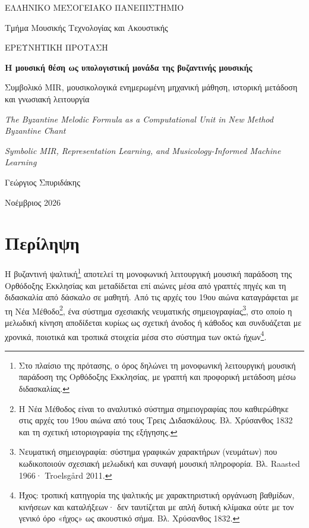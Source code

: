 \documentclass[11pt,a4paper]{article}
\begin{document}
\hypersetup{pageanchor=false}
\begin{titlepage}
\centering
\vspace*{1.0cm}
{\coverfont\large ΕΛΛΗΝΙΚΟ ΜΕΣΟΓΕΙΑΚΟ ΠΑΝΕΠΙΣΤΗΜΙΟ\par}
{\coverfont Τμήμα Μουσικής Τεχνολογίας και Ακουστικής\par}
\vspace{1.5cm}
{\coverfont\large ΕΡΕΥΝΗΤΙΚΗ ΠΡΟΤΑΣΗ\par}
\vspace{1.3cm}
{\coverfont\LARGE\bfseries Η μουσική θέση ως υπολογιστική μονάδα της βυζαντινής μουσικής\par}
\vspace{0.65cm}
{\coverfont\large Συμβολικό MIR, μουσικολογικά ενημερωμένη μηχανική μάθηση, ιστορική μετάδοση και γνωσιακή λειτουργία\par}
\vspace{1.1cm}
{\coverfont\large\itshape The Byzantine Melodic Formula as a Computational Unit in New Method Byzantine Chant\par}
\vspace{0.3cm}
{\coverfont\normalsize\itshape Symbolic MIR, Representation Learning, and Musicology-Informed Machine Learning\par}
\vspace{9.8cm}
{\coverfont Γεώργιος Σπυριδάκης\par}
\vspace{0.8cm}
{\coverfont\small Νοέμβριος 2026\par}
\vfill
\end{titlepage}
\hypersetup{pageanchor=true}

\section*{Περίληψη}

Η βυζαντινή ψαλτική\footnote{Στο πλαίσιο της πρότασης, ο όρος δηλώνει τη μονοφωνική λειτουργική μουσική παράδοση της Ορθόδοξης Εκκλησίας, με γραπτή και προφορική μετάδοση μέσω διδασκαλίας.} αποτελεί τη μονοφωνική λειτουργική μουσική παράδοση της Ορθόδοξης Εκκλησίας και μεταδίδεται επί αιώνες μέσα από γραπτές πηγές και τη διδασκαλία από δάσκαλο σε μαθητή. Από τις αρχές του 19ου αιώνα καταγράφεται με τη Νέα Μέθοδο\footnote{Η Νέα Μέθοδος είναι το αναλυτικό σύστημα σημειογραφίας που καθιερώθηκε στις αρχές του 19ου αιώνα από τους Τρεις Διδασκάλους. Βλ. Χρύσανθος 1832 και τη σχετική ιστοριογραφία της εξήγησης.}, ένα σύστημα σχεσιακής νευματικής σημειογραφίας\footnote{Νευματική σημειογραφία: σύστημα γραφικών χαρακτήρων (νευμάτων) που κωδικοποιούν σχεσιακή μελωδική και συναφή μουσική πληροφορία. Βλ. Raasted 1966· Troelsgård 2011.}, στο οποίο η μελωδική κίνηση αποδίδεται κυρίως ως σχετική άνοδος ή κάθοδος και συνδυάζεται με χρονικά, ποιοτικά και τροπικά στοιχεία μέσα στο σύστημα των οκτώ ήχων\footnote{Ήχος: τροπική κατηγορία της ψαλτικής με χαρακτηριστική οργάνωση βαθμίδων, κινήσεων και καταλήξεων· δεν ταυτίζεται με απλή δυτική κλίμακα ούτε με τον γενικό όρο «ήχος» ως ακουστικό σήμα. Βλ. Χρύσανθος 1832.}.
\end{document}
